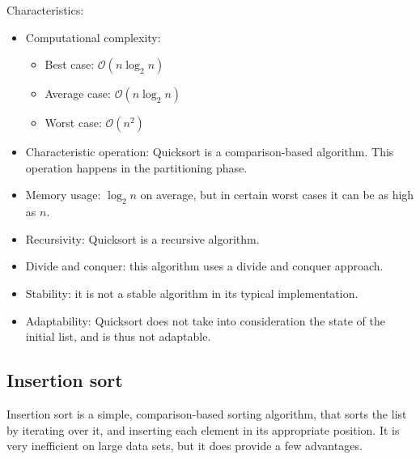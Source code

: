 \documentclass[12pt, a4paper]{article}
\begin{document}
Characteristics:
\begin{itemize}
\item Computational complexity:
\begin{itemize}
\item Best case: $\mathcal{O}(n \log_2 n)$
\item Average case: $\mathcal{O}(n \log_2 n)$
\item Worst case: $\mathcal{O}(n^2)$
\end{itemize}
\item Characteristic operation: Quicksort is a comparison-based algorithm. This operation happens in the partitioning phase.
\item Memory usage: $\log_2 n$ on average, but in certain worst cases it can be as high as $n$.
\item Recursivity: Quicksort is a recursive algorithm.
\item Divide and conquer: this algorithm uses a divide and conquer approach.
\item Stability: it is not a stable algorithm in its typical implementation.
\item Adaptability: Quicksort does not take into consideration the state of the initial list, and is thus not adaptable.
\end{itemize}
\newpage

\subsection{Insertion sort}

Insertion sort is a simple, comparison-based sorting algorithm, that sorts the list by iterating over it, and inserting each element in its appropriate position. It is very inefficient on large data sets, but it does provide a few advantages.
\end{document}
